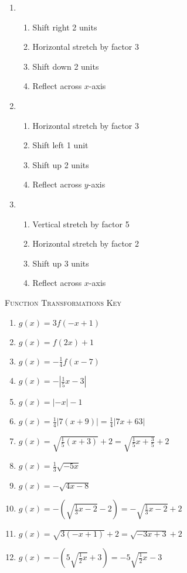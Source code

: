 \begin{enumerate}	\setcounter{enumi}{\value{Review}}
\item \begin{enumerate}[(1)]
\setlength\itemsep{0pt}
    \item Shift right 2 units
    \item Horizontal stretch by factor 3
    \item Shift down 2 units
    \item Reflect across $x$-axis
\end{enumerate}

\item
\begin{enumerate}[(1)]
\setlength\itemsep{0pt}
    \item Horizontal stretch by factor 3
    \item Shift left 1 unit
    \item Shift up 2 units
    \item Reflect across $y$-axis
\end{enumerate}

\item
\begin{enumerate}[(1)]
\setlength\itemsep{0pt}
    \item Vertical stretch by factor 5
    \item Horizontal stretch by factor 2
    \item Shift up 3 units
    \item Reflect across $x$-axis
\end{enumerate}
\setcounter{Review}{\value{enumi}}
\end{enumerate}

\newpage

\textsc{Function Transformations Key} 

\begin{enumerate}
	\item $g(x) = 3f(-x+1)$
	\item $g(x) = f(2x)+1$
	\item $g(x) = -\frac{1}{4}f(x-7)$
    \item $g(x) = -\left|\frac{1}{5}x-3\right|$
    \item $g(x) = |-x|-1$
    \item $g(x) = \frac{1}{4}|7(x+9)| = \frac{1}{4}|7x+63|$
    \item $g(x) = \sqrt{\frac{1}{5}(x+3)} + 2 = \sqrt{\frac{1}{5}x + \frac{3}{5}}+2$
    \item $g(x) = \frac{1}{3}\sqrt{-5x}$
    \item $g(x) = -\sqrt{4x-8}$
    \item $g(x) = -\left(\sqrt{\frac{1}{3}x-2}-2\right) = -\sqrt{\frac{1}{3}x-2}+2$
     \item $g(x) = \sqrt{3(-x+1)}+2 = \sqrt{-3x+3}+2$
     \item $g(x) = -\left(5\sqrt{\frac{1}{2}x}+3\right) = -5\sqrt{\frac{1}{2}x} - 3$
\end{enumerate}